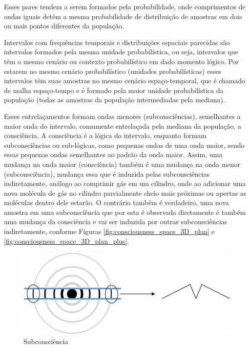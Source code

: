 Esses pares tendem a serem formados pela probabilidade, onde comprimentos de ondas iguais detém a mesma probabilidade de distribuição de amostras em dois ou mais pontos diferentes da população. 

Intervalos com frequências temporais e distribuições espaciais parecidas são intervalos formados pela mesma unidade probabilística, ou seja, intervalos que têm o mesmo cenário ou contexto probabilístico em dado momento lógico. Por estarem no mesmo cenário probabilístico (unidades probabilísticas) esses intervalos têm suas amostras no mesmo cenário espaço-temporal, que é chamado de malha espaço-tempo e é formado pela maior unidade probabilística da população (todas as amostras da população intermediadas pela mediana). 

Esses entrelaçamentos formam ondas menores (subconsciências), semelhantes a maior onda do intervalo, comumente entrelaçada pela mediana da população, a consciência. A consciência é a lógica do intervalo, enquanto formam subconsciências ou sub-lógicas, como pequenas ondas de uma onda maior, sendo essas pequenas ondas semelhantes ao padrão da onda maior. Assim, uma mudança na onda maior (consciência) também é uma mudança na onda menor (subconsciência), mudança essa que é induzida pelas subconsciências indiretamente, análogo ao comprimir gás em um cilindro, onde ao adicionar uma nova molécula de gás no cilindro parcialmente cheio mais próximas ou apertas as moléculas dentro dele estarão. O contrário também é verdadeiro, uma nova amostra em uma subconsciência que por esta é observada diretamente é também uma mudança da consciência e vai ser induzida por outras subconsciências indiretamente, conforme Figuras \ref{fig:consciousness_space_3D_plan} e \ref{fig:consciousness_space_3D_plan_plus}.
	\begin{figure}[H]
	\caption{Subconsciência}
	\label{fig:consciousness_subconscious}
	\centering
	\includegraphics[scale=.8]{sections/images/consciousness_subconscious.jpg}
	\end{figure}
	
